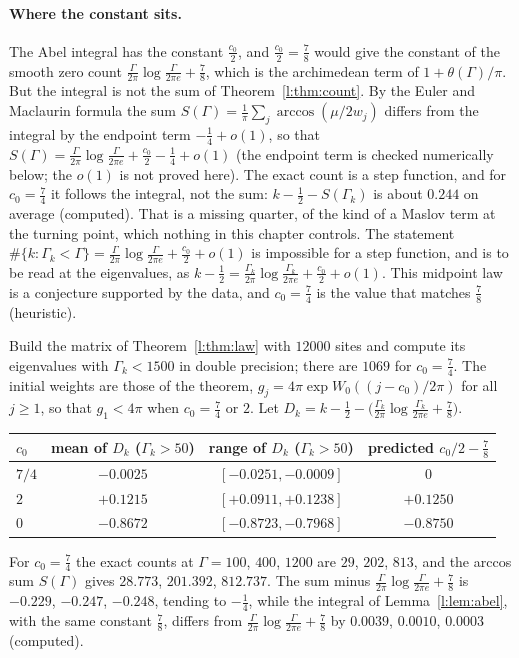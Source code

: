 \paragraph{Where the constant sits.} The Abel integral has the constant $\frac{c_0}2$, and $\frac{c_0}2=\frac78$ would give the constant of the smooth zero count $\frac\Gamma{2\pi}\log\frac\Gamma{2\pi e}+\frac78$, which is the archimedean term of $1+\theta(\Gamma)/\pi$. But the integral is not the sum of Theorem~\ref{l:thm:count}. By the Euler and Maclaurin formula the sum $S(\Gamma)=\frac1\pi\sum_j\arccos(\mu/2w_j)$ differs from the integral by the endpoint term $-\frac14+o(1)$, so that $S(\Gamma)=\frac\Gamma{2\pi}\log\frac\Gamma{2\pi e}+\frac{c_0}2-\frac14+o(1)$ (the endpoint term is checked numerically below; the $o(1)$ is not proved here). The exact count is a step function, and for $c_0=\frac74$ it follows the integral, not the sum: $k-\frac12-S(\Gamma_k)$ is about $0.244$ on average (computed). That is a missing quarter, of the kind of a Maslov term at the turning point, which nothing in this chapter controls. The statement $\#\{k:\Gamma_k<\Gamma\}=\frac\Gamma{2\pi}\log\frac\Gamma{2\pi e}+\frac{c_0}2+o(1)$ is impossible for a step function, and is to be read at the eigenvalues, as $k-\frac12=\frac{\Gamma_k}{2\pi}\log\frac{\Gamma_k}{2\pi e}+\frac{c_0}2+o(1)$. This midpoint law is a conjecture supported by the data, and $c_0=\frac74$ is the value that matches $\frac78$ (heuristic).

\begin{remark}\label{l:comp:direct}
Build the matrix of Theorem~\ref{l:thm:law} with $12000$ sites and compute its eigenvalues with $\Gamma_k<1500$ in double precision; there are $1069$ for $c_0=\frac74$. The initial weights are those of the theorem, $g_j=4\pi\exp W_0((j-c_0)/2\pi)$ for all $j\ge1$, so that $g_1<4\pi$ when $c_0=\frac74$ or $2$. Let $D_k=k-\frac12-\bigl(\frac{\Gamma_k}{2\pi}\log\frac{\Gamma_k}{2\pi e}+\frac78\bigr)$.
\begin{center}\small
\begin{tabular}{@{}lccc@{}}
\toprule
$c_0$ & mean of $D_k$ ($\Gamma_k>50$) & range of $D_k$ ($\Gamma_k>50$) & predicted $c_0/2-\frac78$\\
\midrule
$7/4$ & $-0.0025$ & $[-0.0251,-0.0009]$ & $0$\\
$2$ & $+0.1215$ & $[+0.0911,+0.1238]$ & $+0.1250$\\
$0$ & $-0.8672$ & $[-0.8723,-0.7968]$ & $-0.8750$\\
\bottomrule
\end{tabular}
\end{center}
For $c_0=\frac74$ the exact counts at $\Gamma=100$, $400$, $1200$ are $29$, $202$, $813$, and the arccos sum $S(\Gamma)$ gives $28.773$, $201.392$, $812.737$. The sum minus $\frac\Gamma{2\pi}\log\frac\Gamma{2\pi e}+\frac78$ is $-0.229$, $-0.247$, $-0.248$, tending to $-\frac14$, while the integral of Lemma~\ref{l:lem:abel}, with the same constant $\frac78$, differs from $\frac\Gamma{2\pi}\log\frac\Gamma{2\pi e}+\frac78$ by $0.0039$, $0.0010$, $0.0003$ (computed).
\end{remark}


